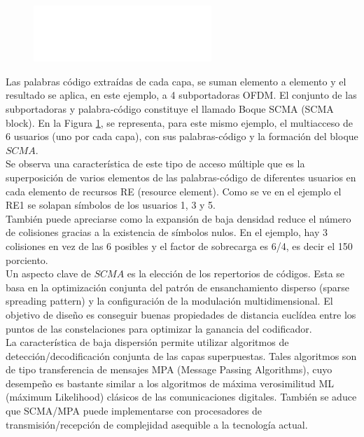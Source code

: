 \documentclass[]{article}
\begin{document}
\begin{figure}[h!]
	\centering
	\includegraphics[width=0.6\textwidth]{Imagenes/OFDM.png}
	\label{fig:OFDM}
\end{figure}


Las palabras código extraídas de cada capa, se suman elemento a elemento y el resultado se aplica, en este ejemplo, a 4 subportadoras OFDM. El conjunto de las subportadoras y palabra-código constituye el llamado Boque SCMA (SCMA block).
En la Figura \ref{fig:OFDM}, se representa, para este mismo ejemplo, el multiacceso de 6 usuarios (uno por cada capa), con sus palabras-código y la formación del bloque $SCMA$.\\

Se observa una característica de este tipo de acceso múltiple que es la superposición de varios elementos de las palabras-código de diferentes usuarios en cada elemento de recursos RE (resource element). Como se ve en el ejemplo el RE1 se solapan símbolos de los usuarios 1, 3 y 5.\\

También puede apreciarse como la expansión de baja densidad reduce el número de colisiones gracias a la existencia de símbolos nulos. En el ejemplo, hay 3 colisiones en vez de las 6 posibles y el factor de sobrecarga es 6/4, es decir el 150 porciento.\\

Un aspecto clave de $SCMA$ es la elección de los repertorios de códigos. Esta se basa en la optimización conjunta del patrón de ensanchamiento disperso (sparse spreading pattern) y la configuración de la modulación multidimensional. El objetivo de diseño es conseguir buenas propiedades de distancia euclídea entre los puntos de las constelaciones para optimizar la ganancia del codificador.\\

La característica de baja dispersión permite utilizar algoritmos de detección/decodificación conjunta de las capas superpuestas. Tales algoritmos son de tipo transferencia de mensajes MPA (Message Passing Algorithms), cuyo desempeño es bastante similar a los algoritmos de máxima verosimilitud ML (máximum Likelihood) clásicos de las comunicaciones digitales. También se aduce que SCMA/MPA puede implementarse con procesadores de transmisión/recepción de complejidad asequible a la tecnología actual.\\
 
\end{document}
